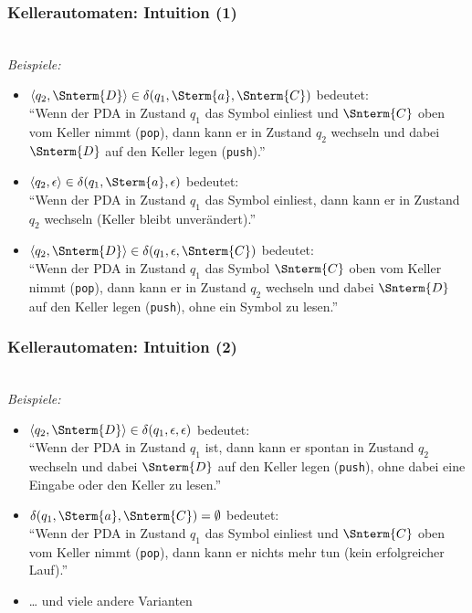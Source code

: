 \documentclass[aspectratio=1610,onlymath]{beamer}
\begin{document}
\begin{frame}[t]\frametitle{Kellerautomaten: Intuition (1)}

\\[1ex]

\emph{Beispiele:}
\begin{itemize}
\item $\tuple{q_2,\Snterm{D}}\in\delta(q_1,\Sterm{a},\Snterm{C})$ bedeutet:\\
"`Wenn der PDA in Zustand $q_1$ das Symbol  einliest und $\Snterm{C}$ oben vom Keller nimmt (\texttt{pop}),
dann \alert{kann} er in Zustand $q_2$ wechseln und dabei $\Snterm{D}$ auf den Keller legen (\texttt{push})."'\pause
%
\item $\tuple{q_2,\epsilon}\in\delta(q_1,\Sterm{a},\epsilon)$ bedeutet:\\
"`Wenn der PDA in Zustand $q_1$ das Symbol  einliest, dann \alert{kann} er in Zustand $q_2$ wechseln (Keller bleibt unverändert)."'\pause
%
\item $\tuple{q_2,\Snterm{D}}\in\delta(q_1,\epsilon,\Snterm{C})$ bedeutet:\\
"`Wenn der PDA in Zustand $q_1$ das Symbol $\Snterm{C}$ oben vom Keller nimmt (\texttt{pop}),
dann \alert{kann} er in Zustand $q_2$ wechseln und dabei $\Snterm{D}$ auf den Keller legen (\texttt{push}),
ohne ein Symbol zu lesen."'
\end{itemize}

\end{frame}

\begin{frame}[t]\frametitle{Kellerautomaten: Intuition (2)}

\\[1ex]

\emph{Beispiele:}
\begin{itemize}
\item $\tuple{q_2,\Snterm{D}}\in\delta(q_1,\epsilon,\epsilon)$ bedeutet:\\
"`Wenn der PDA in Zustand $q_1$ ist, dann \alert{kann} er spontan in Zustand $q_2$ wechseln und dabei $\Snterm{D}$ auf den Keller legen (\texttt{push}), ohne dabei eine Eingabe oder den Keller zu lesen."'\pause
\item $\delta(q_1,\Sterm{a},\Snterm{C})=\emptyset$ bedeutet:\\
"`Wenn der PDA in Zustand $q_1$ das Symbol  einliest und $\Snterm{C}$ oben vom Keller nimmt (\texttt{pop}),
dann kann er nichts mehr tun (kein erfolgreicher Lauf)."'
\item \ldots{} und viele andere Varianten
\end{itemize}

\end{frame}
\end{document}
